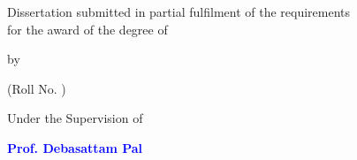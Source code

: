 
\thispagestyle{empty}
\singlespacing
\begin{titlepage}
\begin{center}
    \centering
     
      
  {{\LARGE \textbf{\dissertationTitleX}\par}}
    \vspace{-0.2cm}%
     
    \vspace{1cm}
    {Dissertation submitted in partial fulfilment of the requirements \\ for the award of the degree of \par}
    {
    \textbf{\large \degree} \par}
    \vspace{0.2cm}


    {\large by\par}
    {\large \textbf{\textcolor{blue}{\authornames}}\par} 
    \normalsize {(Roll No. \authorrollno)}
    \vspace{0.3cm}
    
    {Under the Supervision of \par}
    {\large \textbf{\textbf{\textcolor{blue}{Prof. Debasattam Pal}}}\par}
     \vspace{0.6 cm}


\end{center}
\end{titlepage}
